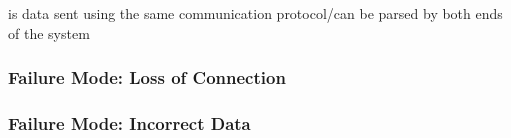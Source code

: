 is data sent using the same communication protocol/can be parsed by both ends of the system

\subsubsection{Failure Mode: Loss of Connection}
\label{sec:comm_fm_loss}

\subsubsection{Failure Mode: Incorrect Data}
\label{sec:comm_fm_incorrect}

